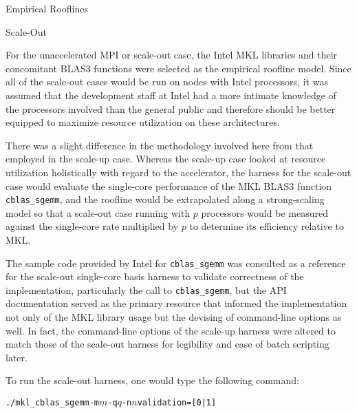 \documentclass{article}
\begin{document}
\begin{section}{Empirical Rooflines}
\begin{subsection}{Scale-Out}
    \begin{paragraph}{}
      For the unaccelerated MPI or scale-out case, the Intel MKL libraries and their concomitant BLAS3 functions were selected as the empirical roofline model.
      Since all of the scale-out cases would be run on nodes with Intel processors, it was assumed that the development staff at Intel had a more intimate knowledge
      of the processors involved than the general public and therefore should be better equipped to maximize resource utilization on these architectures.
    \end{paragraph}
    \begin{paragraph}{}
      There was a slight difference in the methodology involved here from that employed in the scale-up case. Whereas the scale-up case looked at resource utilization
      holistically with regard to the accelerator, the harness for the scale-out case would evaluate the single-core performance of the MKL BLAS3 function
      \texttt{cblas\_sgemm}\autocite{MKLcblassgemm}, and the roofline would be extrapolated along a strong-scaling model so that a scale-out case running with $p$
      processors would be measured against the single-core rate multiplied by $p$ to determine its efficiency relative to MKL.
    \end{paragraph}
    \begin{paragraph}{}
      The sample code provided by Intel for \texttt{cblas\_sgemm}\autocite{MKLcblassgemmx} was consulted as a reference for the scale-out single-core
      basis harness to validate correctness of the implementation, particularly the call to \texttt{cblas\_sgemm}, but the API documentation served as the
      primary resource that informed the implementation not only of the MKL library usage but the devising of command-line options as well. In fact, the
      command-line options of the scale-up harness were altered to match those of the scale-out harness for legibility and ease of batch scripting later.
    \end{paragraph}
    \begin{paragraph}{}
      To run the scale-out harness, one would type the following command:
      \begin{subparagraph}{}
        \begin{alltt}
          ./mkl\_cblas\_sgemm -m \(m\) -q \(q\) -n \(n\) validation=[0|1]
        \end{alltt}
      \end{subparagraph}
    \end{paragraph}

\end{subsection}
\end{section}
\end{document}
